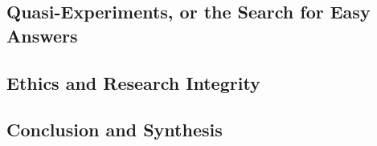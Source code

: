 \documentclass[12pt,a4paper]{article}
\begin{document}
\subsection{Quasi-Experiments, or the Search for Easy Answers} %

\subsection{Ethics and Research Integrity}

\subsection{Conclusion and Synthesis}





\end{document}

